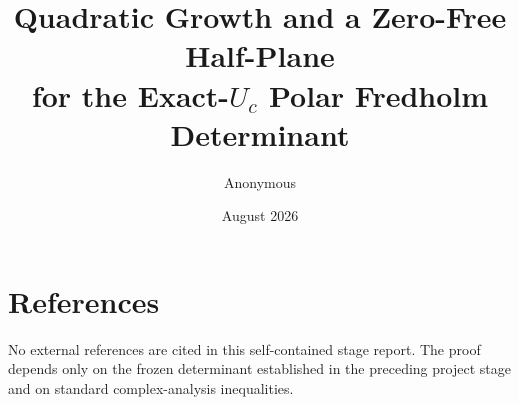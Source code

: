 \documentclass[11pt]{article}
\title{Quadratic Growth and a Zero-Free Half-Plane\\
for the Exact-\(U_c\) Polar Fredholm Determinant}
\author{Anonymous}
\date{August 2026}
\begin{document}
\maketitle
\begin{abstract}

\end{abstract}






\appendix

\section*{References}
No external references are cited in this self-contained stage report. The
proof depends only on the frozen determinant established in the preceding
project stage and on standard complex-analysis inequalities.
\end{document}
